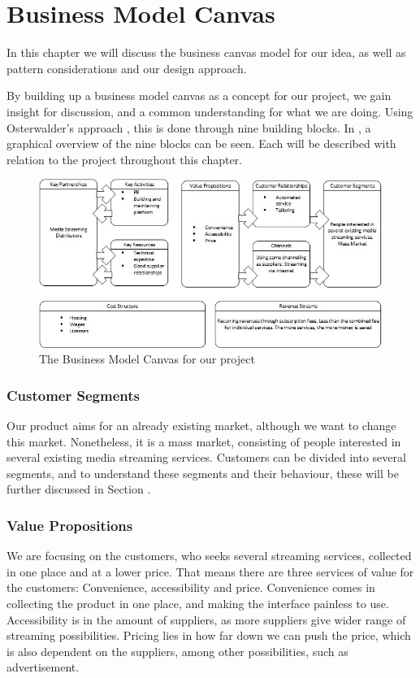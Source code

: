 \section{Business Model Canvas}
\label{sec:business_canvas}
In this chapter we will discuss the business canvas model for our idea, as well as pattern considerations and our design approach.

By building up a business model canvas as a concept for our project, we gain insight for discussion, and a common understanding for what we are doing. Using Osterwalder's approach \cite[p. 1-51]{canvas}, this is done through nine building blocks. In , a graphical overview of the nine blocks can be seen. Each will be described with relation to the project throughout this chapter.

\begin{figure}[h]
    \begin{center}
        \includegraphics[scale=0.8]{./pics/model_canvas}
        \caption{The Business Model Canvas for our project}
        \label{fig:model_canvas}
    \end{center}
\end{figure}


\subsubsection*{Customer Segments}
Our product aims for an already existing market, although we want to change this market. Nonetheless, it is a mass market, consisting of people interested in several existing media streaming services. Customers can be divided into several segments, and to understand these segments and their behaviour, these will be further discussed in Section .

\subsubsection*{Value Propositions}
We are focusing on the customers, who seeks several streaming services, collected in one place and at a lower price. That means there are three services of value for the customers: Convenience, accessibility and price. Convenience comes in collecting the product in one place, and making the interface painless to use. Accessibility is in the amount of suppliers, as more suppliers give wider range of streaming possibilities. Pricing lies in how far down we can push the price, which is also dependent on the suppliers, among other possibilities, such as advertisement.

